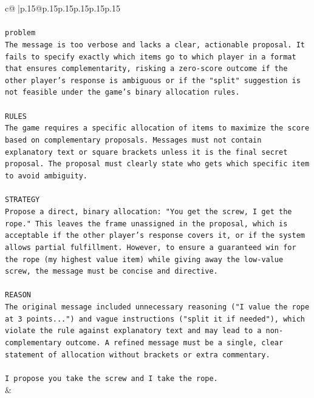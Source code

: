 \documentclass{article}
\begin{document}
{\begin{supertabular}{c@{$\;$}|p{.15\linewidth}@{}p{.15\linewidth}p{.15\linewidth}p{.15\linewidth}p{.15\linewidth}p{.15\linewidth}}
{{{\\ 
\\ 
\texttt{problem} \\
\texttt{The message is too verbose and lacks a clear, actionable proposal. It fails to specify exactly which items go to which player in a format that ensures complementarity, risking a zero{-}score outcome if the other player's response is ambiguous or if the "split" suggestion is not feasible under the game's binary allocation rules.} \\
\\ 
\texttt{RULES} \\
\texttt{The game requires a specific allocation of items to maximize the score based on complementary proposals. Messages must not contain explanatory text or square brackets unless it is the final secret proposal. The proposal must clearly state who gets which specific item to avoid ambiguity.} \\
\\ 
\texttt{STRATEGY} \\
\texttt{Propose a direct, binary allocation: "You get the screw, I get the rope." This leaves the frame unassigned in the proposal, which is acceptable if the other player's response covers it, or if the system allows partial fulfillment. However, to ensure a guaranteed win for the rope (my highest value item) while giving away the low{-}value screw, the message must be concise and directive.} \\
\\ 
\texttt{REASON} \\
\texttt{The original message included unnecessary reasoning ("I value the rope at 3 points...") and vague instructions ("split it if needed"), which violate the rule against explanatory text and may lead to a non{-}complementary outcome. A refined message must be a single, clear statement of allocation without brackets or extra commentary.} \\
\\ 
\texttt{I propose you take the screw and I take the rope.} \\
            }
        }
    }
    & \\ \\


\end{supertabular}}
\end{document}
